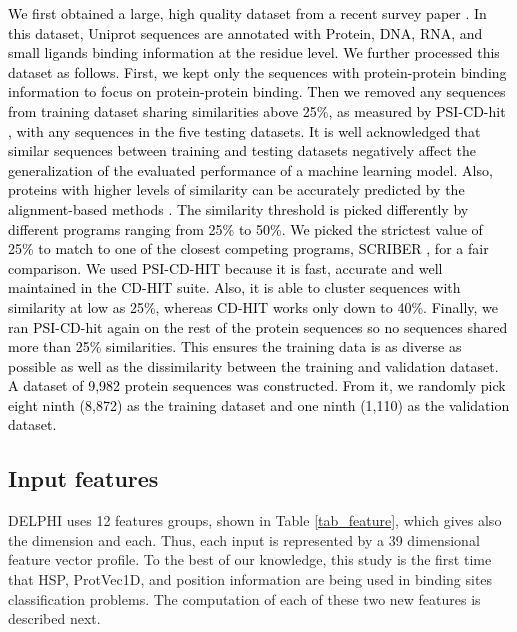 \documentclass{bioinfo}
\newcommand{\myColor}{black}
\begin{document}
\begin{methods}
\textcolor{\myColor}{
We first obtained a large, high quality dataset from a recent survey paper \citep{zhang2019comprehensive}. In this dataset, Uniprot sequences are annotated with Protein, DNA, RNA, and small ligands binding information at the residue level. We further processed this dataset as follows. First, we kept only the sequences with protein-protein binding information to focus on protein-protein binding. Then we removed any sequences from training dataset sharing similarities above 25\%, as measured by PSI-CD-hit \citep{li2006cd,fu2012cd}, with any sequences in the five testing datasets. It is well acknowledged that similar sequences between training and testing datasets negatively affect the generalization of the evaluated performance of a machine learning model. Also, proteins with higher levels of similarity can be accurately predicted by the alignment-based methods \citep{zhang2018review}. The similarity threshold is picked differently by different programs ranging from 25\% to 50\%. We picked the strictest value of 25\% to match to one of the closest competing programs, SCRIBER \citep{zhang2019scriber}, for a fair comparison. We used PSI-CD-HIT because it is fast, accurate and well maintained in the CD-HIT suite. Also, it is able to cluster sequences with similarity at low as 25\%, whereas CD-HIT works only down to 40\%. Finally, we ran PSI-CD-hit again on the rest of the protein sequences so no sequences shared more than 25\% similarities. This ensures the training data is as diverse as possible as well as the dissimilarity between the training and validation dataset. A dataset of 9,982 protein sequences was constructed. From it, we randomly pick eight ninth (8,872) as the training dataset and one ninth (1,110) as the validation dataset. }

\subsection{Input features}
DELPHI uses 12 features groups, shown in Table \ref{tab_feature}, which gives also the dimension and each. Thus, each input is represented by a 39 dimensional feature vector profile. To the best of our knowledge, this study is the first time that HSP, ProtVec1D, and position information are being used in binding sites classification problems. The computation of each of these two new features is described next.


\end{methods}
\end{document}
